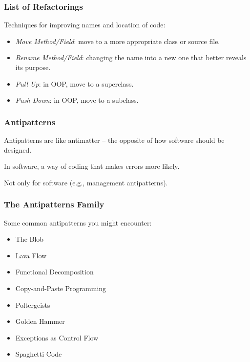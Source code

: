 \begin{frame}
\frametitle{List of Refactorings}
\begin{changemargin}{1cm}

Techniques for improving names and location of code:
\begin{itemize}
\item \emph{Move Method/Field}: move to a more appropriate class or source file.
\item \emph{Rename Method/Field}: changing the name into a new one that better reveals its purpose.
\item \emph{Pull Up}: in OOP, move to a superclass.
\item \emph{Push Down}: in OOP, move to a subclass.
\end{itemize}


\end{changemargin}
\end{frame}


\begin{frame}
\frametitle{Antipatterns}
\begin{changemargin}{1cm}

Antipatterns are like antimatter -- the opposite of how software should be designed.

In software, a way of coding that makes errors more likely.

Not only for software (e.g., management antipatterns).

\end{changemargin}
\end{frame}

\begin{frame}
\frametitle{The Antipatterns Family}
\begin{changemargin}{1cm}

Some common antipatterns you might encounter:

\begin{itemize}
	\item The Blob
	\item Lava Flow
	\item Functional Decomposition
	\item Copy-and-Paste Programming
	\item Poltergeists
	\item Golden Hammer
	\item Exceptions as Control Flow
	\item Spaghetti Code
\end{itemize}


\end{changemargin}
\end{frame}


